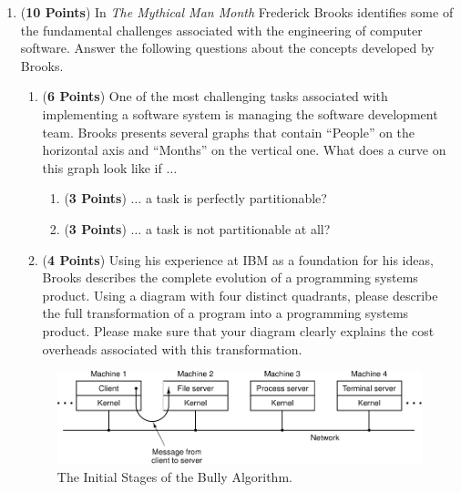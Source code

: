 \documentclass[12pt,epsf,psfig,graphics]{article}
\begin{document}
\begin{enumerate}
  
\item ({\bf 10 Points}) In {\em The Mythical Man Month} Frederick Brooks identifies some of the fundamental challenges
  associated with the engineering of computer software.  Answer the following questions about the concepts developed by
  Brooks.

  \begin{enumerate}
          
  \item ({\bf 6 Points}) One of the most challenging tasks associated
    with implementing a software system is managing the software
    development team.  Brooks presents several graphs that contain
    ``People'' on the horizontal axis and ``Months'' on the vertical
    one.  What does a curve on this graph look like if $\ldots$

    \begin{enumerate}

      \item ({\bf 3 Points}) $\ldots$ a task is perfectly partitionable?
    
      \item ({\bf 3 Points}) $\ldots$ a task is not partitionable at all?

    \end{enumerate}

  \item ({\bf 4 Points}) Using his experience at IBM as a foundation
    for his ideas, Brooks describes the complete evolution of a
    programming systems product.  Using a diagram with four distinct
    quadrants, please describe the full transformation of a program
    into a programming systems product.  Please make sure that your
    diagram clearly explains the cost overheads associated with this
    transformation.

  \end{enumerate}
        
\newpage

\begin{figure}[t]
\centering
\includegraphics{fig1-27}
\caption{The Initial Stages of the Bully Algorithm.}
\label{figure:bully}
\end{figure}


\end{enumerate}
\end{document}
